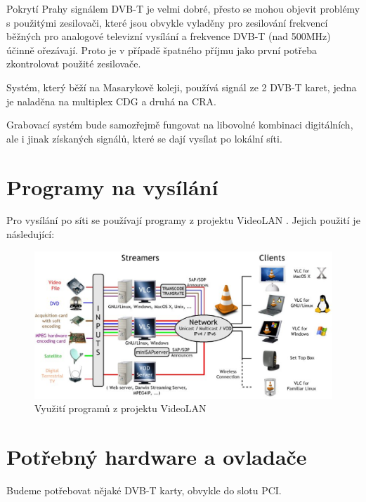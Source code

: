 Pokrytí Prahy signálem DVB-T je velmi dobré, přesto se mohou objevit problémy s použitými zesilovači, které jsou obvykle vyladěny pro zesilování frekvencí běžných pro analogové televizní vysílání a frekvence DVB-T (nad 500MHz) účinně ořezávají. Proto je v případě špatného příjmu jako první potřeba zkontrolovat použité zesilovače.

Systém, který běží na Masarykově koleji, používá signál ze 2 DVB-T karet, jedna je naladěna na multiplex CDG a druhá na CRA. 

Grabovací systém bude samozřejmě fungovat na libovolné kombinaci digitálních, ale i jinak získaných signálů, které se dají vysílat po lokální síti.

\section{Programy na vysílání}

\vspace{10pt}
Pro vysílání po síti se používají programy z projektu VideoLAN \cite{videolanURL}. Jejich použití je následující:

\vspace{10pt}

\begin{figure}[h]
\begin{center}
\includegraphics[width=15cm]{images/videolan.eps}
\caption{Využití programů z projektu VideoLAN}
\label{fig:videolan}
\end{center}
\end{figure}

\vspace{10pt}

\section{Potřebný hardware a ovladače}
Budeme potřebovat nějaké DVB-T karty, obvykle do slotu PCI.


